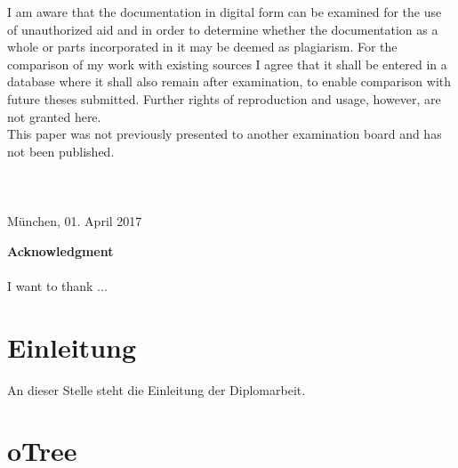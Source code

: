 I am aware that the documentation in digital form can be examined for the use of unauthorized aid and in order to determine whether the documentation as a whole or parts incorporated in it may be deemed as plagiarism. For the comparison of my work with existing sources I agree that it shall be entered in a database where it shall also remain after examination, to enable comparison with future theses submitted. Further rights of reproduction and usage, however, are not granted here.\\
 
This paper was not previously presented to another examination board and has not been published. \\\\\\\\

M\"{u}nchen, 01. April 2017

\newpage

\vspace*{2.2cm}

\noindent%
{\Huge {\bf Acknowledgment}} \\
\vspace*{1.6cm} \\

I want to thank ...

\setcounter{page}{0} %
\pagestyle{headings}


\tableofcontents      %

\listoffigures

\listoftables
 
 

 


\chapter{Einleitung} \label{cha:einleitung}

An dieser Stelle steht die Einleitung der Diplomarbeit.



\chapter{oTree} \label{cha:otree}

